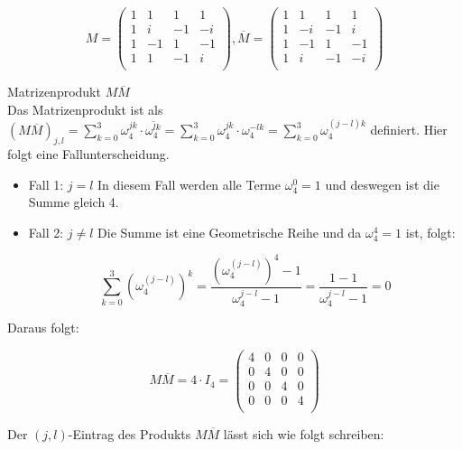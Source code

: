 \documentclass[12pt]{scrartcl}
\begin{document}
\begin{enumAlph}
     \[   
     M=\begin{pmatrix}
     1 & 1 & 1 & 1      \\
     1 & i & -1 & -i    \\
     1 & -1 & 1 & -1    \\
     1 & 1 & -1 & i     \\
     \end{pmatrix}
    ,
    \overline{M}=\begin{pmatrix}
     1 & 1 & 1 & 1      \\
     1 & -i & -1 & i    \\
     1 & -1 & 1 & -1    \\
     1 & i & -1 & -i     \\
     \end{pmatrix}
    \]    
    \item Matrizenprodukt $M\overline{M}$\\
    
    Das Matrizenprodukt ist als 
    $(M\overline{M})_{j,l} = \sum_{k=0}^{3} \omega_4^{jk}\cdot \overline{\omega_4^{lk}}
    = \sum_{k=0}^{3} \omega_4^{jk}\cdot \omega_4^{-lk}
    = \sum_{k=0}^{3} \omega_4^{(j-l)k}$
    definiert. Hier folgt eine Fallunterscheidung.

    \begin{itemize}
        \item[] Fall 1: $j = l$
        In diesem Fall werden alle Terme $\omega_4^0 = 1$ und deswegen ist die Summe gleich 4.

        \item[] Fall 2: $j \neq l$
        Die Summe ist eine Geometrische Reihe und da $\omega_4^4=1$ ist, folgt:

        \[\sum_{k=0}^{3}(\omega_4^{(j-l)})^k = \frac{(\omega_4^{(j-l)})^4-1}{\omega_4^{j-l}-1}=\frac{1-1}{\omega_4^{j-l}-1}=0\]
        
    \end{itemize}

    Daraus folgt:
        
    \[
    M\overline{M} = 4 \cdot I_4=
    \begin{pmatrix}
    4 & 0 & 0 & 0      \\
    0 & 4 & 0 & 0    \\
    0 & 0 & 4 & 0    \\
    0 & 0 & 0 & 4     \\
    \end{pmatrix}
    \]
        
    \newpage
    \item 
    Der $(j,l)$-Eintrag des Produkts $M\overline{M}$ lässt sich wie folgt schreiben:


\end{enumAlph}
\end{document}
